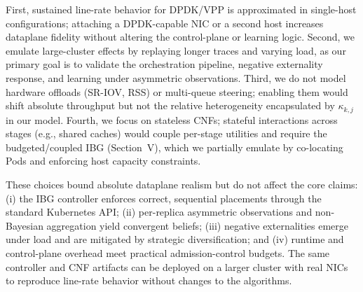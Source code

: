 \documentclass[journal]{IEEEtran}
\theoremstyle{plain}
\theoremstyle{definition}
\theoremstyle{remark}
\begin{document}
First, sustained line-rate behavior for DPDK/VPP is approximated in single-host configurations; attaching a DPDK-capable NIC or a second host increases dataplane fidelity without altering the control-plane or learning logic. Second, we emulate large-cluster effects by replaying longer traces and varying load, as our primary goal is to validate the orchestration pipeline, negative externality response, and learning under asymmetric observations. Third, we do not model hardware offloads (SR-IOV, RSS) or multi-queue steering; enabling them would shift absolute throughput but not the relative heterogeneity encapsulated by $\kappa_{k,j}$ in our model. Fourth, we focus on stateless CNFs; stateful interactions across stages (e.g., shared caches) would couple per-stage utilities and require the budgeted/coupled IBG (Section~V), which we partially emulate by co-locating Pods and enforcing host capacity constraints.

These choices bound absolute dataplane realism but do not affect the core claims: (i) the IBG controller enforces correct, sequential placements through the standard Kubernetes API; (ii) per-replica asymmetric observations and non-Bayesian aggregation yield convergent beliefs; (iii) negative externalities emerge under load and are mitigated by strategic diversification; and (iv) runtime and control-plane overhead meet practical admission-control budgets. The same controller and CNF artifacts can be deployed on a larger cluster with real NICs to reproduce line-rate behavior without changes to the algorithms.
\end{document}
